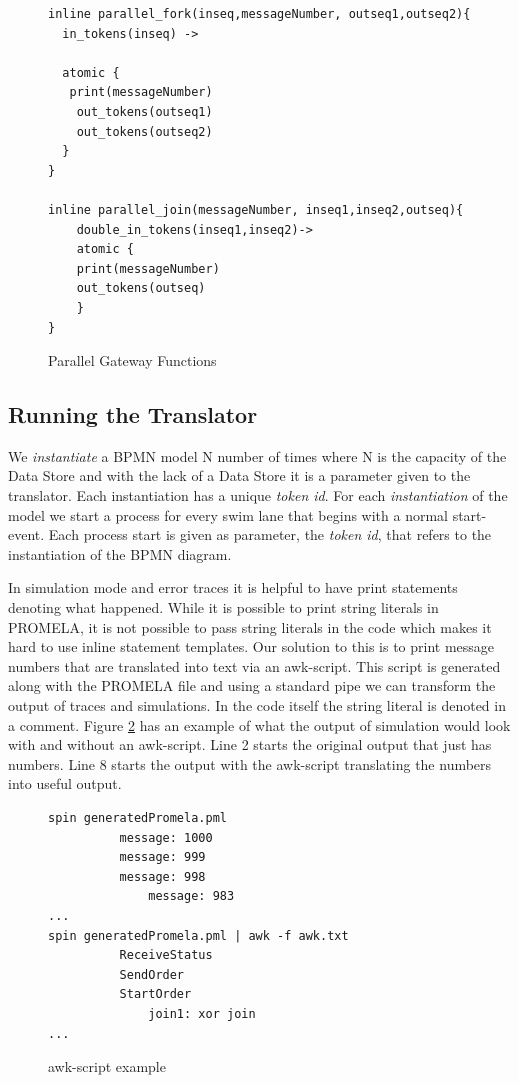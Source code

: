 \documentclass[11pt,twocolumn]{article}
\begin{document}
\begin{figure}
\begin{lstlisting}
inline parallel_fork(inseq,messageNumber, outseq1,outseq2){
  in_tokens(inseq) ->
 
  atomic {
   print(messageNumber)
	out_tokens(outseq1)
	out_tokens(outseq2)
  }
}

inline parallel_join(messageNumber, inseq1,inseq2,outseq){
  	double_in_tokens(inseq1,inseq2)-> 
	atomic {
	print(messageNumber)
 	out_tokens(outseq)
	}
}
\end{lstlisting}

\caption{Parallel Gateway Functions}
\label{fig:parallelGatewayFunctions}
\end{figure}
\subsection{Running the Translator}\label{sec:runningTranslation}

We \emph{instantiate} a BPMN model N number of times where N is the capacity of the Data Store and with the lack of a Data Store it is a parameter given to the translator. Each instantiation has a unique \emph{token id}. For each \emph{instantiation} of the model we start a process for every swim lane that begins with a normal start-event. Each process start is given as parameter, the \emph{token id}, that refers to the instantiation of the BPMN diagram.

In simulation mode and error traces it is helpful to have print statements denoting what happened. While it is possible to print string literals in PROMELA, it is not possible to pass string literals in the code which makes it hard to use inline statement templates. Our solution to this is to print message numbers that are translated into text via an awk-script. This script is generated along with the PROMELA file and using a standard pipe we can transform the output of traces and simulations. In the code itself the string literal is denoted in a comment. Figure \ref{fig:awkExample} has an example of what the output of simulation would look with and without an awk-script. Line 2 starts the original output that just has numbers. Line 8 starts the output with the awk-script translating the numbers into useful output.


\begin{figure}
\begin{lstlisting}
spin generatedPromela.pml
          message: 1000
          message: 999
          message: 998
              message: 983
...
spin generatedPromela.pml | awk -f awk.txt
          ReceiveStatus
          SendOrder
          StartOrder
              join1: xor join
...
\end{lstlisting}
\caption{awk-script example}
\label{fig:awkExample}
\end{figure}		  
\end{document}
